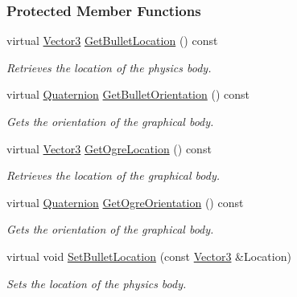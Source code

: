 \subsubsection*{Protected Member Functions}
\begin{DoxyCompactItemize}
\item 
virtual \hyperlink{classMezzanine_1_1Vector3}{Vector3} \hyperlink{classMezzanine_1_1ActorBase_a9f110d013ed871809258dfc55f8b7276}{GetBulletLocation} () const 
\begin{DoxyCompactList}\small\item\em Retrieves the location of the physics body. \item\end{DoxyCompactList}\item 
virtual \hyperlink{classMezzanine_1_1Quaternion}{Quaternion} \hyperlink{classMezzanine_1_1ActorBase_a32fc60215d8bcd3151b3158d481ce0ef}{GetBulletOrientation} () const 
\begin{DoxyCompactList}\small\item\em Gets the orientation of the graphical body. \item\end{DoxyCompactList}\item 
virtual \hyperlink{classMezzanine_1_1Vector3}{Vector3} \hyperlink{classMezzanine_1_1ActorBase_a8095a72bdfcf7fd02953423ae17acd01}{GetOgreLocation} () const 
\begin{DoxyCompactList}\small\item\em Retrieves the location of the graphical body. \item\end{DoxyCompactList}\item 
virtual \hyperlink{classMezzanine_1_1Quaternion}{Quaternion} \hyperlink{classMezzanine_1_1ActorBase_ae76175894f1c2bc4372ec1ebd5ede83d}{GetOgreOrientation} () const 
\begin{DoxyCompactList}\small\item\em Gets the orientation of the graphical body. \item\end{DoxyCompactList}\item 
virtual void \hyperlink{classMezzanine_1_1ActorBase_a8f7018838c67f07cd554730ac83f4283}{SetBulletLocation} (const \hyperlink{classMezzanine_1_1Vector3}{Vector3} \&Location)
\begin{DoxyCompactList}\small\item\em Sets the location of the physics body. \item\end{DoxyCompactList}\item 

\end{DoxyCompactItemize}
